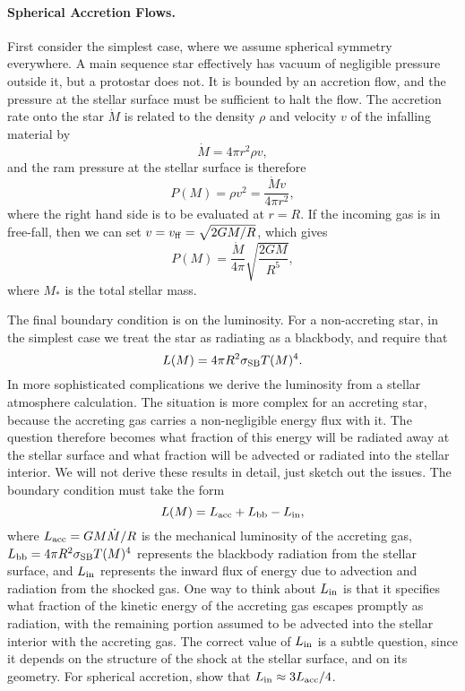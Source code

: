 \paragraph{Spherical Accretion Flows.} First consider the simplest case, where we assume spherical symmetry everywhere. A main sequence star effectively has vacuum of negligible pressure outside it, but a protostar does not. It is bounded by an accretion flow, and  the pressure at the stellar surface must be sufficient to halt the flow. The accretion rate onto the star $\dot{M}$ is related to the density $\rho$ and velocity $v$ of the infalling material by
\begin{equation}
\dot{M} = 4\pi r^2 \rho v,
\end{equation}
and the ram pressure at the stellar surface is therefore
\begin{equation}
P(M) = \rho v^2 = \frac{\dot{M} v}{4\pi r^2},
\end{equation}
where the right hand side is to be evaluated at $r=R$. If the incoming gas is in free-fall, then we can set $v = v_{\rm ff} = \sqrt{2GM/R}$, which gives
\begin{equation}
\label{pbound1}
P(M) = \frac{\dot{M}}{4\pi} \sqrt{\frac{2 G M}{R^5}},
\end{equation}
where $M_*$ is the total stellar mass. 

The final boundary condition is on the luminosity. For a non-accreting star, in the simplest case we treat the star as radiating as a blackbody, and require that
\begin{equation}
\label{lbound2}
L(M)=4\pi R^2 \sigma_{\rm SB} T(M)^4.
\end{equation}
In more sophisticated complications we derive the luminosity from a stellar atmosphere calculation. The situation is more complex for an accreting star, because the accreting gas carries a non-negligible energy flux with it. The question therefore becomes what fraction of this energy will be radiated away at the stellar surface and what fraction will be advected or radiated into the stellar interior. We will not derive these results in detail, just sketch out the issues. The boundary condition must take the form
\begin{equation}
\label{lbound1}
L(M) = L_{\rm acc} + L_{\rm bb} - L_{\rm in},
\end{equation}
where $L_{\rm acc}=G M \dot{M}/R$ is the mechanical luminosity of the accreting gas, $L_{\rm bb} = 4\pi R^2 \sigma_{\rm SB} T(M)^4$ represents the blackbody radiation from the stellar surface, and $L_{\rm in}$ represents the inward flux of energy due to advection and radiation from the shocked gas. One way to think about $L_{\rm in}$ is that it specifies what fraction of the kinetic energy of the accreting gas escapes promptly as radiation, with the remaining portion assumed to be advected into the stellar interior with the accreting gas. The correct value of $L_{\rm in}$ is a subtle question, since it depends on the structure of the shock at the stellar surface, and on its geometry. For spherical accretion, \citet{stahler80a, stahler80b, stahler81a} show that $L_{\rm in}\approx 3 L_{\rm acc}/4$. 

